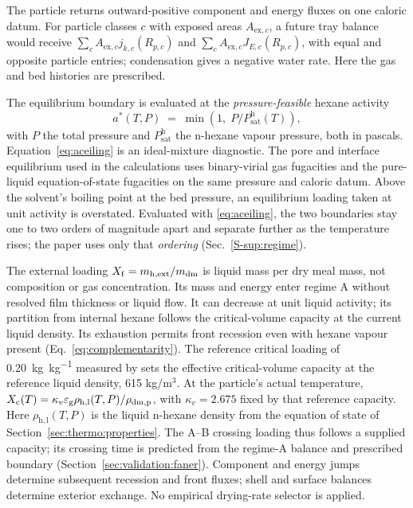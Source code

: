 The particle returns outward-positive component and energy fluxes on one
caloric datum. For particle classes $c$ with exposed areas $A_{\mathrm{ex},c}$,
a future tray balance would receive $\sum_c A_{\mathrm{ex},c}j_{k,c}(R_{p,c})$
and $\sum_c A_{\mathrm{ex},c}J_{E,c}(R_{p,c})$, with equal and opposite
particle entries; condensation gives a negative water rate. Here the gas
and bed histories are prescribed.

The equilibrium boundary is evaluated at the \emph{pressure-feasible} hexane
activity
\begin{equation}
a^{*}(T,P) \;=\; \min\!\left(1,\;P/P_{\mathrm{sat}}^{\mathrm{h}}(T)\right),
\label{eq:aceiling}
\end{equation}
with $P$ the total pressure and $P_{\mathrm{sat}}^{\mathrm{h}}$ the n-hexane
vapour pressure, both in pascals. Equation~\eqref{eq:aceiling} is an
ideal-mixture diagnostic. The pore and interface equilibrium used in the
calculations uses binary-virial gas fugacities and the pure-liquid equation-of-state
fugacities on the same pressure and caloric datum. Above the solvent's
boiling point at the bed pressure, an equilibrium loading taken at unit
activity is overstated. Evaluated with
\eqref{eq:aceiling}, the two boundaries stay one to two orders of magnitude
apart and separate further as the temperature rises; the paper uses only that
\emph{ordering} (Sec.~\ref*{S-sup:regime}).

The external loading $X_{\mathrm{f}}=m_{\mathrm{h,ext}}/m_{\mathrm{dm}}$ is liquid mass
per dry meal mass, not composition or gas concentration. Its mass and
energy enter regime A without resolved film thickness or liquid flow.
It can decrease at unit liquid activity; its partition from internal
hexane follows the critical-volume capacity at the current liquid density.
Its exhaustion permits front recession even with hexane vapour present
(Eq.~\eqref{eq:complementarity}).
The reference critical loading of
\SI{0.20}{\kilogram\per\kilogram} measured by
\citet{faner2019kinetics} sets the effective critical-volume capacity
at the reference liquid density, 615 kg/m$^3$. At the particle's actual
temperature, $X_{\mathrm{c}}(T)=\kappa_v\varepsilon_{\mathrm g}
\rho_{\mathrm{h,l}}(T,P)/\rho_{\mathrm{dm,p}}$, with $\kappa_v=2.675$ fixed by that
reference capacity. Here $\rho_{\mathrm{h,l}}(T,P)$ is the liquid n-hexane
density from the equation of state of Section~\ref{sec:thermo:properties}.
The A--B crossing loading thus follows a supplied capacity; its crossing
time is predicted from the regime-A balance and prescribed boundary
(Section~\ref{sec:validation:faner}). Component and energy jumps determine subsequent
recession and front fluxes; shell and surface balances determine exterior
exchange. No empirical drying-rate selector is applied.

